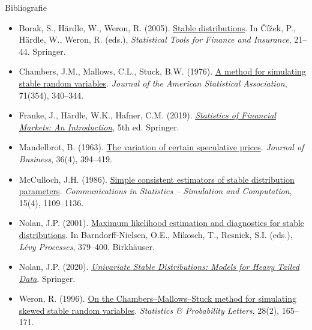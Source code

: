 \begin{frame}{Bibliografie}
\itemsize{\tiny}
\begin{itemize}
    \item Borak, S., Härdle, W., Weron, R. (2005). \href{https://doi.org/10.1007/3-540-27395-6_1}{Stable distributions}. In Čížek, P., Härdle, W., Weron, R. (eds.), \textit{Statistical Tools for Finance and Insurance}, 21--44. Springer.
    \item Chambers, J.M., Mallows, C.L., Stuck, B.W. (1976). \href{https://doi.org/10.1080/01621459.1976.10480344}{A method for simulating stable random variables}. \textit{Journal of the American Statistical Association}, 71(354), 340--344.
    \item Franke, J., Härdle, W.K., Hafner, C.M. (2019). \href{https://doi.org/10.1007/978-3-030-13751-9}{\textit{Statistics of Financial Markets: An Introduction}}, 5th ed. Springer.
    \item Mandelbrot, B. (1963). \href{https://doi.org/10.1086/294632}{The variation of certain speculative prices}. \textit{Journal of Business}, 36(4), 394--419.
    \item McCulloch, J.H. (1986). \href{https://doi.org/10.1080/03610918608812563}{Simple consistent estimators of stable distribution parameters}. \textit{Communications in Statistics -- Simulation and Computation}, 15(4), 1109--1136.
    \item Nolan, J.P. (2001). \href{https://doi.org/10.1007/978-1-4612-0197-7_17}{Maximum likelihood estimation and diagnostics for stable distributions}. In Barndorff-Nielsen, O.E., Mikosch, T., Resnick, S.I. (eds.), \textit{Lévy Processes}, 379--400. Birkhäuser.
    \item Nolan, J.P. (2020). \href{https://doi.org/10.1007/978-3-030-52915-4}{\textit{Univariate Stable Distributions: Models for Heavy Tailed Data}}. Springer.
    \item Weron, R. (1996). \href{https://doi.org/10.1016/0167-7152(95)00113-1}{On the Chambers--Mallows--Stuck method for simulating skewed stable random variables}. \textit{Statistics \& Probability Letters}, 28(2), 165--171.
\end{itemize}
\end{frame}


